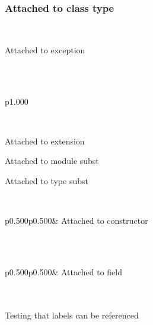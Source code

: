 \label{Labels-class-type-cs}\begin{ocamlindent}\subsubsection{Attached to class type\label{L8}}%
\end{ocamlindent}%
\\
\label{Labels-exception-E}\begin{ocamlindent}Attached to exception\end{ocamlindent}%
\medbreak
\label{Labels-type-x}\\
\label{Labels-extension-decl-X}\\
\begin{ocamltabular}{p{1.000\textwidth}}\label{Labels-extension-X}\\
\end{ocamltabular}%
\\
\begin{ocamlindent}Attached to extension\end{ocamlindent}%
\medbreak
\label{Labels-module-S}\begin{ocamlindent}Attached to module subst\end{ocamlindent}%
\medbreak
\label{Labels-type-s}\begin{ocamlindent}Attached to type subst\end{ocamlindent}%
\medbreak
\label{Labels-type-u}\\
\begin{ocamltabular}{p{0.500\textwidth}p{0.500\textwidth}}\label{Labels-type-u.A'}& Attached to constructor\\
\end{ocamltabular}%
\\
\label{Labels-type-v}\\
\begin{ocamltabular}{p{0.500\textwidth}p{0.500\textwidth}}\label{Labels-type-v.f}& Attached to field\\
\end{ocamltabular}%
\\
\ocamlcodefragment{\}}\\
Testing that labels can be referenced

